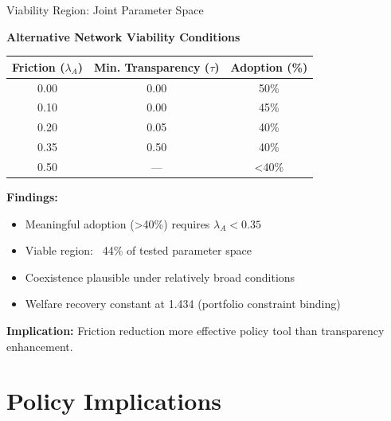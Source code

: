 \documentclass[aspectratio=169]{beamer}
\begin{document}
\begin{frame}{Viability Region: Joint Parameter Space}
    
    \textbf{Alternative Network Viability Conditions}
    
    \vspace{0.3cm}
    \begin{table}
        \centering
        \small
        \begin{tabular}{ccc}
            \toprule
            \textbf{Friction ($\lambda_A$)} & \textbf{Min. Transparency ($\tau$)} & \textbf{Adoption (\%)} \\
            \midrule
            0.00 & 0.00 & 50\% \\
            0.10 & 0.00 & 45\% \\
            0.20 & 0.05 & 40\% \\
            \textcolor{AlertRed}{0.35} & 0.50 & \textcolor{AlertRed}{40\%} \\
            0.50 & --- & <40\% \\
            \bottomrule
        \end{tabular}
    \end{table}
    
    \vspace{0.3cm}
    \textbf{Findings:}
    \begin{itemize}
        \item Meaningful adoption (>40\%) requires $\lambda_A < 0.35$
        \item Viable region: ~44\% of tested parameter space
        \item Coexistence plausible under relatively broad conditions
        \item Welfare recovery constant at 1.434 (portfolio constraint binding)
    \end{itemize}
    
    \vspace{0.3cm}
    \textbf{Implication:} Friction reduction more effective policy tool than transparency enhancement.

\end{frame}

\section{Policy Implications}
\end{document}
